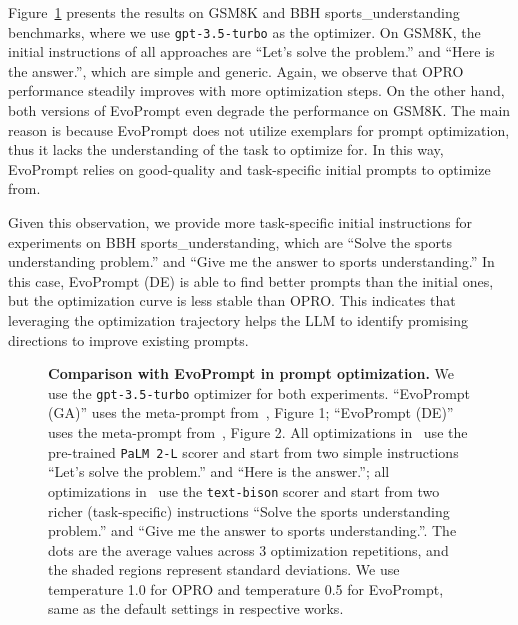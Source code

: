 Figure~\ref{fig:comparison_with_evoprompt} presents the results on GSM8K and BBH sports\_understanding benchmarks, where we use \texttt{gpt-3.5-turbo} as the optimizer. On GSM8K, the initial instructions of all approaches are ``Let's solve the problem.'' and ``Here is the answer.'', which are simple and generic. Again, we observe that OPRO performance steadily improves with more optimization steps. On the other hand, both versions of EvoPrompt even degrade the performance on GSM8K. The main reason is because EvoPrompt does not utilize exemplars for prompt optimization, thus it lacks the understanding of the task to optimize for. In this way, EvoPrompt relies on good-quality and task-specific initial prompts to optimize from.

Given this observation, we provide more task-specific initial instructions for experiments on BBH sports\_understanding, which are ``Solve the sports understanding problem.'' and ``Give me the answer to sports understanding.'' In this case, EvoPrompt (DE) is able to find better prompts than the initial ones, but the optimization curve is less stable than OPRO. This indicates that leveraging the optimization trajectory helps the LLM to identify promising directions to improve existing prompts.

\begin{figure}[t]
\centering
{}
\hspace{.01\linewidth}
\caption{\textbf{Comparison with EvoPrompt in prompt optimization.}
We use the \texttt{gpt-3.5-turbo} optimizer for both experiments.
``EvoPrompt (GA)'' uses the meta-prompt from~\citet{guo2023connecting}, Figure 1; ``EvoPrompt (DE)'' uses the meta-prompt from~\citet{guo2023connecting}, Figure 2.
All optimizations in~ use the pre-trained \texttt{PaLM 2-L} scorer and start from two simple instructions ``Let's solve the problem.'' and ``Here is the answer.''; all optimizations in~ use the \texttt{text-bison} scorer and start from two richer (task-specific) instructions ``Solve the sports understanding problem.'' and ``Give me the answer to sports understanding.''.
The dots are the average values across 3 optimization repetitions, and the shaded regions represent standard deviations.
We use temperature 1.0 for OPRO and temperature 0.5 for EvoPrompt, same as the default settings in respective works.
}
\label{fig:comparison_with_evoprompt}
\end{figure}